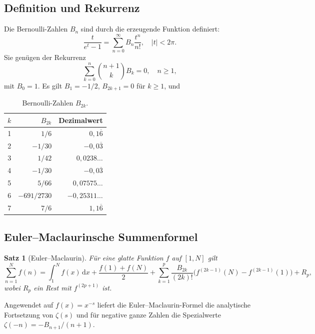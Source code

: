 \documentclass[12pt,a4paper]{amsart}
\newtheorem{theorem}{Satz}[section]
\theoremstyle{definition}
\theoremstyle{remark}
\begin{document}
\subsection{Definition und Rekurrenz}

Die Bernoulli-Zahlen $B_n$ sind durch die erzeugende Funktion definiert:
\[
  \frac{t}{e^t - 1} = \sum_{n=0}^{\infty} B_n \frac{t^n}{n!}, \quad |t| < 2\pi.
\]
Sie genügen der Rekurrenz
\[
  \sum_{k=0}^{n} \binom{n+1}{k} B_k = 0, \quad n \geq 1,
\]
mit $B_0 = 1$. Es gilt $B_1 = -1/2$, $B_{2k+1} = 0$ für $k \geq 1$, und

\begin{table}[h]
  \centering
  \caption{Bernoulli-Zahlen $B_{2k}$.}
  \vspace{4pt}
  \begin{tabular}{@{}crr@{}}
    \toprule
    $k$ & $B_{2k}$ & Dezimalwert \\
    \midrule
    1 & $1/6$               & $0{,}1\overline{6}$ \\
    2 & $-1/30$             & $-0{,}0\overline{3}$ \\
    3 & $1/42$              & $0{,}0238\ldots$ \\
    4 & $-1/30$             & $-0{,}0\overline{3}$ \\
    5 & $5/66$              & $0{,}07575\ldots$ \\
    6 & $-691/2730$         & $-0{,}25311\ldots$ \\
    7 & $7/6$               & $1{,}1\overline{6}$ \\
    \bottomrule
  \end{tabular}
\end{table}

\subsection{Euler--Maclaurinsche Summenformel}

\begin{theorem}[Euler--Maclaurin]
  Für eine glatte Funktion $f$ auf $[1, N]$ gilt
  \[
    \sum_{n=1}^{N} f(n) = \int_1^N f(x)\,\mathrm{d}x
    + \frac{f(1) + f(N)}{2}
    + \sum_{k=1}^{p} \frac{B_{2k}}{(2k)!}\bigl(f^{(2k-1)}(N) - f^{(2k-1)}(1)\bigr)
    + R_p,
  \]
  wobei $R_p$ ein Rest mit $f^{(2p+1)}$ ist.
\end{theorem}

Angewendet auf $f(x) = x^{-s}$ liefert die Euler--Maclaurin-Formel die analytische
Fortsetzung von $\zeta(s)$ und für negative ganze Zahlen die Spezialwerte
$\zeta(-n) = -B_{n+1}/(n+1)$.
\end{document}
